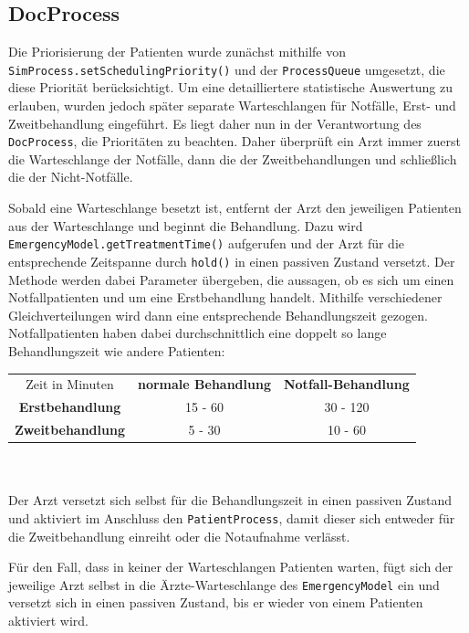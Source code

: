 \documentclass{article}
\begin{document}
\subsection{DocProcess}

Die Priorisierung der Patienten wurde zunächst mithilfe von \\ \texttt{SimProcess.setSchedulingPriority()} und der \texttt{ProcessQueue} umgesetzt, die diese Priorität berücksichtigt.
Um eine detailliertere statistische Auswertung zu erlauben, wurden jedoch später separate Warteschlangen für Notfälle, Erst- und Zweitbehandlung eingeführt.
Es liegt daher nun in der Verantwortung des \texttt{DocProcess}, die Prioritäten zu beachten.
Daher überprüft ein Arzt immer zuerst die Warteschlange der Notfälle, dann die der Zweitbehandlungen und schließlich die der Nicht-Notfälle.

Sobald eine Warteschlange besetzt ist, entfernt der Arzt den jeweiligen Patienten aus der Warteschlange und beginnt die Behandlung.
Dazu wird \\ \texttt{EmergencyModel.getTreatmentTime()} aufgerufen und der Arzt für die entsprechende Zeitspanne durch \texttt{hold()} in einen passiven Zustand versetzt.
Der Methode werden dabei Parameter übergeben, die aussagen, ob es sich um einen Notfallpatienten und um eine Erstbehandlung handelt.
Mithilfe verschiedener Gleichverteilungen wird dann eine entsprechende Behandlungszeit gezogen.
Notfallpatienten haben dabei durchschnittlich eine doppelt so lange Behandlungszeit wie andere Patienten:\\

\begin{tabular}{ccc}
Zeit in Minuten & \textbf{normale Behandlung} & \textbf{Notfall-Behandlung} \\
\textbf{Erstbehandlung} & 15 - 60 & 30 - 120 \\
\textbf{Zweitbehandlung} & 5 - 30  & 10 -  60
\end{tabular}
\\\\

Der Arzt versetzt sich selbst für die Behandlungszeit in einen passiven Zustand und aktiviert im Anschluss den \texttt{PatientProcess}, damit dieser sich entweder für die Zweitbehandlung einreiht oder die Notaufnahme verlässt.

Für den Fall, dass in keiner der Warteschlangen Patienten warten,
fügt sich der jeweilige Arzt selbst in die Ärzte-Warteschlange des \texttt{EmergencyModel} ein und versetzt sich in einen passiven Zustand,
bis er wieder von einem Patienten aktiviert wird.
\end{document}
